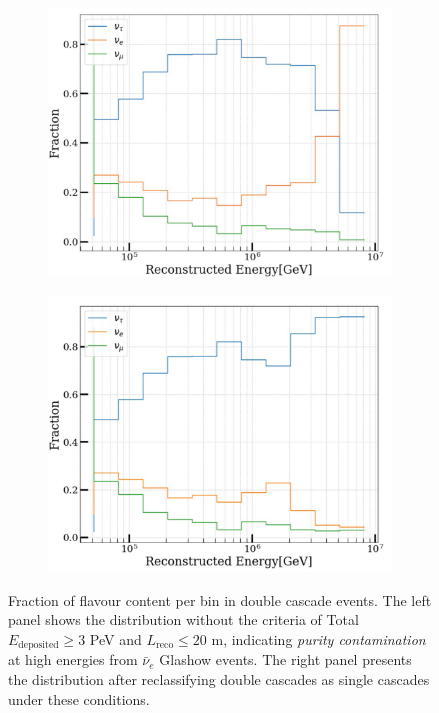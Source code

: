 \begin{figure}[h!]
    \begin{subfigure}[h]{0.7\textwidth}
        \includegraphics{./figures/EventSample/fraction_nomask.pdf}
    \end{subfigure}
    \hfill
    \begin{subfigure}[h]{0.7\textwidth}
        \includegraphics{./figures/EventSample/fraction_withmask.pdf}
       
    \end{subfigure}%
    \caption{Fraction of flavour content per bin in double cascade events. The left panel shows the distribution without the criteria of Total \( E_{\text{deposited}} \geq 3 \) PeV and \( L_{\text{reco}} \leq 20 \) m, indicating \emph{purity contamination} at high energies from \( \bar{\nu}_e \) Glashow events. The right panel presents the distribution after reclassifying double cascades as single cascades under these conditions.}
\end{figure}

